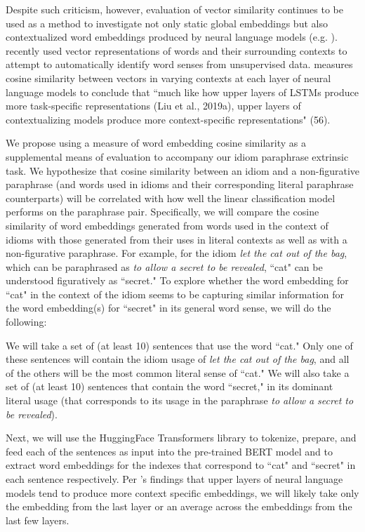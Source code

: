 \documentclass[11pt,a4paper]{article}
\begin{document}
Despite such criticism, however, evaluation of vector similarity continues to be used as a method to investigate not only static global embeddings but also contextualized word embeddings produced by neural language models (e.g. \citet{van_Aken_2019}). \citet{huang_cho_bowman_2020} recently used vector representations of words and their surrounding contexts to attempt to automatically identify word senses from unsupervised data. \citet{ethayarajh2019contextual} measures cosine similarity between vectors in varying contexts at each layer of neural language models to conclude that  ``much like how upper layers of LSTMs produce more task-specific
representations (Liu et al., 2019a), upper layers of contextualizing models produce more context-specific representations" (56).

We propose using a measure of word embedding cosine similarity as a supplemental means of evaluation to accompany our idiom paraphrase extrinsic task. We hypothesize that cosine similarity between an idiom and a non-figurative paraphrase (and words used in idioms and their corresponding literal paraphrase counterparts) will be correlated with how well the linear classification model performs on the paraphrase pair.
Specifically, we will compare the cosine similarity of word embeddings generated from words used in the context of idioms with those generated from their uses in literal contexts as well as with a non-figurative paraphrase. For example, for the idiom \textit{let the cat out of the bag}, which can be paraphrased as \textit{to allow a secret to be revealed}, ``cat" can be understood figuratively as ``secret." To explore whether the word embedding for ``cat" in the context of the idiom seems to be capturing similar information for the word embedding(s) for ``secret" in its general word sense, we will do the following:

 We will take a set of (at least 10) sentences that use the word ``cat."  Only one of these sentences will contain the idiom usage of \textit{let the cat out of the bag}, and all of the others will be the most common literal sense of ``cat." We will also take a set of (at least 10) sentences that contain the word ``secret," in its dominant literal usage (that corresponds to its usage in the paraphrase \textit{to allow a secret to be revealed}).
 
 Next, we will use the HuggingFace Transformers library \citep{wolf2019huggingfaces} to tokenize, prepare, and feed each of the sentences as input into the pre-trained BERT model and to extract word embeddings for the indexes that correspond to ``cat" and ``secret" in each sentence respectively. Per \citet{ethayarajh2019contextual}'s findings that upper layers of neural language models tend to produce more context specific embeddings, we will likely take only the embedding from the last layer or an average across the embeddings from the last few layers.
\end{document}
